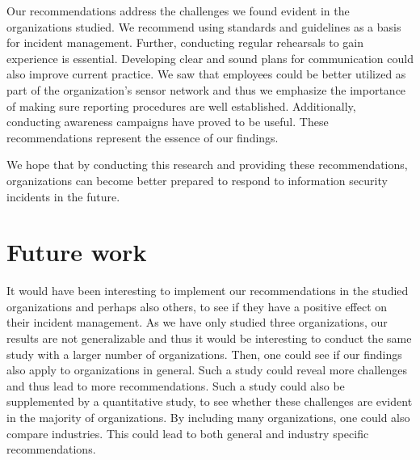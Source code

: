 Our recommendations address the challenges we found evident in the organizations studied. We recommend using standards and guidelines as a basis for incident management. Further, conducting regular rehearsals to gain experience is essential. Developing clear and sound plans for communication could also improve current practice. We saw that employees could be better utilized as part of the organization's sensor network and thus we emphasize the importance of making sure reporting procedures are well established. Additionally, conducting awareness campaigns have proved to be useful. These recommendations represent the essence of our findings. 

We hope that by conducting this research and providing these recommendations, organizations can become better prepared to respond to information security incidents in the future.


\section{Future work}
It would have been interesting to implement our recommendations in the studied organizations and perhaps also others, to see if they have a positive effect on their incident management. As we have only studied three organizations, our results are not generalizable and thus it would be interesting to conduct the same study with a larger number of organizations. Then, one could see if our findings also apply to organizations in general. Such a study could reveal more challenges and thus lead to more recommendations. Such a study could also be supplemented by a quantitative study, to see whether these challenges are evident in the majority of organizations. By including many organizations, one could also compare industries. This could lead to both general and industry specific recommendations.
